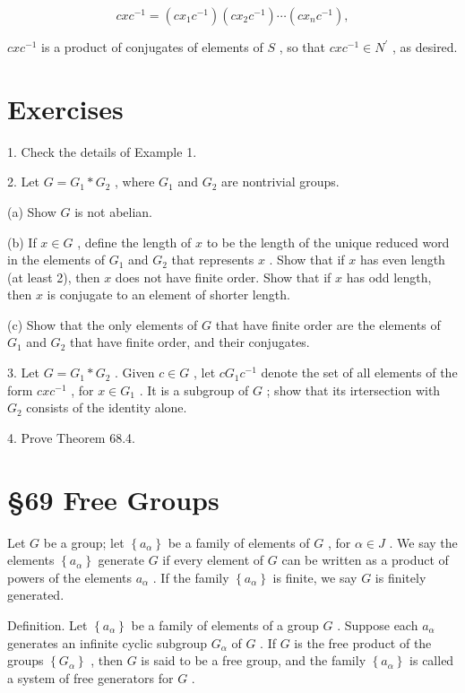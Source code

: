 \[
{cx}{c}^{-1} = \left( {c{x}_{1}{c}^{-1}}\right) \left( {c{x}_{2}{c}^{-1}}\right) \cdots \left( {c{x}_{n}{c}^{-1}}\right) ,
\]

\({cx}{c}^{-1}\) is a product of conjugates of elements of \(S\) , so that \({cx}{c}^{-1} \in  {N}^{\prime }\) , as desired.

\section*{Exercises}

1. Check the details of Example 1.

2. Let \(G = {G}_{1} * {G}_{2}\) , where \({G}_{1}\) and \({G}_{2}\) are nontrivial groups.

(a) Show \(G\) is not abelian.

(b) If \(x \in  G\) , define the length of \(x\) to be the length of the unique reduced word in the elements of \({G}_{1}\) and \({G}_{2}\) that represents \(x\) . Show that if \(x\) has even length (at least 2), then \(x\) does not have finite order. Show that if \(x\) has odd length, then \(x\) is conjugate to an element of shorter length.

(c) Show that the only elements of \(G\) that have finite order are the elements of \({G}_{1}\) and \({G}_{2}\) that have finite order, and their conjugates.

3. Let \(G = {G}_{1} * {G}_{2}\) . Given \(c \in  G\) , let \(c{G}_{1}{c}^{-1}\) denote the set of all elements of the form \({cx}{c}^{-1}\) , for \(x \in  {G}_{1}\) . It is a subgroup of \(G\) ; show that its irtersection with \({G}_{2}\) consists of the identity alone.

4. Prove Theorem 68.4.

\section*{ \S 69 Free Groups}

Let \(G\) be a group; let \(\left\{  {a}_{\alpha }\right\}\) be a family of elements of \(G\) , for \(\alpha  \in  J\) . We say the elements \(\left\{  {a}_{\alpha }\right\}\) generate \(G\) if every element of \(G\) can be written as a product of powers of the elements \({a}_{\alpha }\) . If the family \(\left\{  {a}_{\alpha }\right\}\) is finite, we say \(G\) is finitely generated.

Definition. Let \(\left\{  {a}_{\alpha }\right\}\) be a family of elements of a group \(G\) . Suppose each \({a}_{\alpha }\) generates an infinite cyclic subgroup \({G}_{\alpha }\) of \(G\) . If \(G\) is the free product of the groups \(\left\{  {G}_{\alpha }\right\}\) , then \(G\) is said to be a free group, and the family \(\left\{  {a}_{\alpha }\right\}\) is called a system of free generators for \(G\) .

